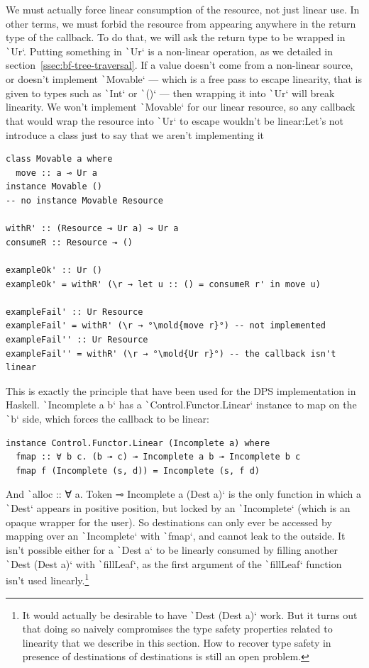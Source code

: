 \documentclass[english]{jflart}
\newcommand{\TODO}[1]{{\color{red}\large #1}}
\newcommand{\mold}[1]{\colorbox{red}{#1}}
\begin{document}
We must actually force linear consumption of the resource, not just linear use. In other terms, we must forbid the resource from appearing anywhere in the return type of the callback. To do that, we will ask the return type to be wrapped in \texttt`Ur`. Putting something in \texttt`Ur` is a non-linear operation, as we detailed in section~\ref{ssec:bf-tree-traversal}. If a value doesn't come from a non-linear source, or doesn't implement \texttt`Movable` --- which is a free pass to escape linearity, that is given to types such as \texttt`Int` or \texttt`()` --- then wrapping it into \texttt`Ur` will break linearity. We won't implement \texttt`Movable` for our linear resource, so any callback that would wrap the resource into \texttt`Ur` to escape wouldn't be linear:\TODO{Let's not introduce a class just to say that we aren't implementing it}
{\small
\begin{verbatim}
class Movable a where
  move :: a ⊸ Ur a
instance Movable ()
-- no instance Movable Resource

withR' :: (Resource ⊸ Ur a) ⊸ Ur a
consumeR :: Resource ⊸ ()

exampleOk' :: Ur ()
exampleOk' = withR' (\r → let u :: () = consumeR r' in move u)

exampleFail' :: Ur Resource
exampleFail' = withR' (\r → °\mold{move r}°) -- not implemented
exampleFail'' :: Ur Resource
exampleFail'' = withR' (\r → °\mold{Ur r}°) -- the callback isn't linear
\end{verbatim}
}

This is exactly the principle that have been used for the DPS implementation in Haskell. \texttt`Incomplete a b` has a \texttt`Control.Functor.Linear` instance to map on the \texttt`b` side, which forces the callback to be linear:

{\small
\begin{verbatim}
instance Control.Functor.Linear (Incomplete a) where
  fmap :: ∀ b c. (b ⊸ c) ⊸ Incomplete a b ⊸ Incomplete b c
  fmap f (Incomplete (s, d)) = Incomplete (s, f d)
\end{verbatim}
}

And \texttt`alloc :: ∀ a. Token ⊸ Incomplete a (Dest a)` is the only function in which a \texttt`Dest` appears in positive position, but locked by an \texttt`Incomplete` (which is an opaque wrapper for the user). So destinations can only ever be accessed by mapping over an \texttt`Incomplete` with \texttt`fmap`, and cannot leak to the outside. It isn't possible either for a \texttt`Dest a` to be linearly consumed by filling another \texttt`Dest (Dest a)` with \texttt`fillLeaf`, as the first argument of the \texttt`fillLeaf` function isn't used linearly.\footnote{It would actually be desirable to have \texttt`Dest (Dest a)` work. But it turns out that doing so naively compromises the type safety properties related to linearity that we describe in this section. How to recover type safety in presence of destinations of destinations is still an open problem.}
\end{document}
